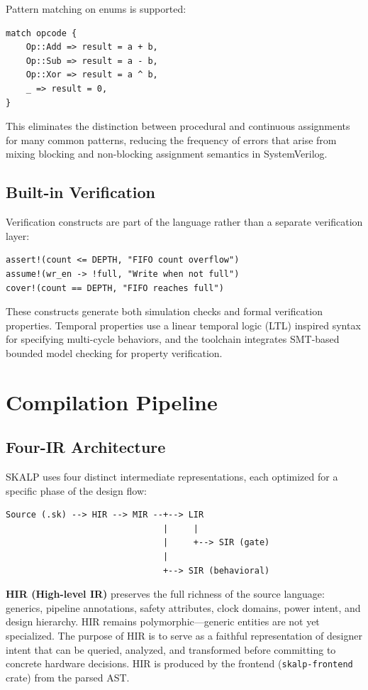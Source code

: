 \documentclass[conference]{IEEEtran}
\begin{document}
Pattern matching on enums is supported:
\begin{lstlisting}
match opcode {
    Op::Add => result = a + b,
    Op::Sub => result = a - b,
    Op::Xor => result = a ^ b,
    _ => result = 0,
}
\end{lstlisting}

This eliminates the distinction between procedural and continuous assignments for many common patterns, reducing the frequency of errors that arise from mixing blocking and non-blocking assignment semantics in SystemVerilog.

\subsection{Built-in Verification}

Verification constructs are part of the language rather than a separate verification layer:

\begin{lstlisting}
assert!(count <= DEPTH, "FIFO count overflow")
assume!(wr_en -> !full, "Write when not full")
cover!(count == DEPTH, "FIFO reaches full")
\end{lstlisting}

These constructs generate both simulation checks and formal verification properties. Temporal properties use a linear temporal logic (LTL) inspired syntax for specifying multi-cycle behaviors, and the toolchain integrates SMT-based bounded model checking for property verification.

\section{Compilation Pipeline}
\label{sec:pipeline}

\subsection{Four-IR Architecture}

SKALP uses four distinct intermediate representations, each optimized for a specific phase of the design flow:

\begin{lstlisting}
Source (.sk) --> HIR --> MIR --+--> LIR
                               |     |
                               |     +--> SIR (gate)
                               |
                               +--> SIR (behavioral)
\end{lstlisting}

\textbf{HIR (High-level IR)} preserves the full richness of the source language: generics, pipeline annotations, safety attributes, clock domains, power intent, and design hierarchy. HIR remains polymorphic---generic entities are not yet specialized. The purpose of HIR is to serve as a faithful representation of designer intent that can be queried, analyzed, and transformed before committing to concrete hardware decisions. HIR is produced by the frontend (\texttt{skalp-frontend} crate) from the parsed AST.
\end{document}
